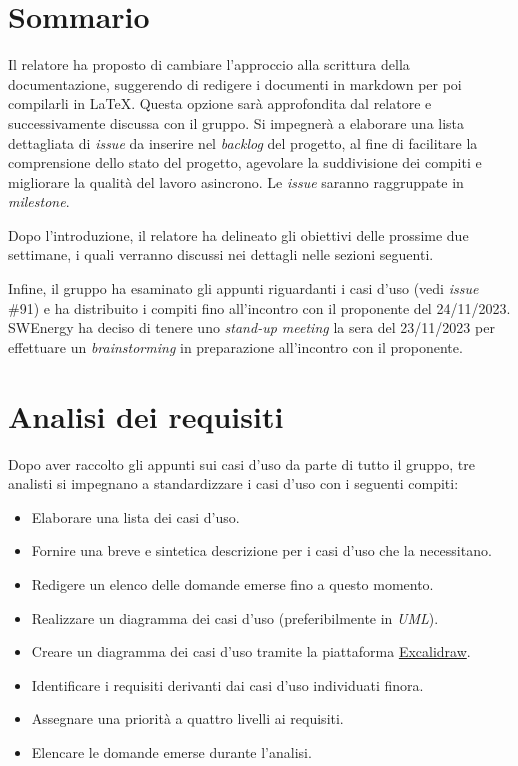 \section{Sommario}

Il relatore ha proposto di cambiare l'approccio alla scrittura della
documentazione, suggerendo di redigere i documenti in markdown per poi
compilarli in \LaTeX{}. Questa opzione sarà approfondita dal relatore e
successivamente discussa con il gruppo. Si impegnerà a elaborare una lista
dettagliata di \textit{issue} da inserire nel \textit{backlog} del progetto, al fine di
facilitare la comprensione dello stato del progetto, agevolare la suddivisione
dei compiti e migliorare la qualità del lavoro asincrono. Le \textit{issue}
saranno raggruppate in \textit{milestone}.

Dopo l'introduzione, il relatore ha delineato gli obiettivi delle prossime due
settimane, i quali verranno discussi nei dettagli nelle sezioni seguenti.

Infine, il gruppo ha esaminato gli appunti riguardanti i casi d'uso (vedi
\textit{issue} \#91) e ha distribuito i compiti fino all'incontro con il
proponente del 24/11/2023. SWEnergy ha deciso di tenere uno \textit{stand-up
	meeting} la sera del 23/11/2023 per effettuare un \textit{brainstorming} in
preparazione all'incontro con il proponente.

\section{Analisi dei requisiti}

Dopo aver raccolto gli appunti sui casi d'uso da parte di tutto il gruppo, tre
analisti si impegnano a standardizzare i casi d'uso con i seguenti compiti:

\begin{itemize}
	\item Elaborare una lista dei casi d'uso.
	\item Fornire una breve e sintetica descrizione per i casi d'uso che la
	      necessitano.
	\item Redigere un elenco delle domande emerse fino a questo momento.
	\item Realizzare un diagramma dei casi d'uso (preferibilmente in
	      \textit{UML}).
	\item Creare un diagramma dei casi d'uso tramite la piattaforma
	      \href{https://excalidraw.com/}{Excalidraw}.
	\item Identificare i requisiti derivanti dai casi d'uso individuati finora.
	\item Assegnare una priorità a quattro livelli ai requisiti.
	\item Elencare le domande emerse durante l'analisi.
\end{itemize}

